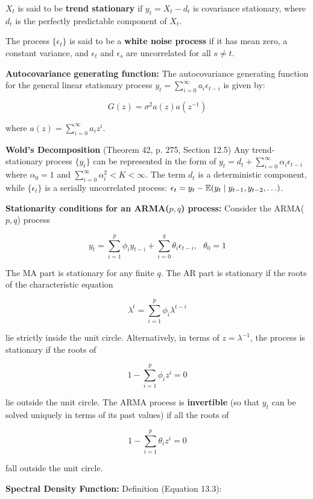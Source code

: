 \begin{definition}\label{ts.12.trendstationary}\(X_t\) is said to be \textbf{trend stationary} if \(y_t = X_t - d_t\) is covariance stationary, where \(d_t\) is the perfectly predictable component of \(X_t\).
\end{definition}

The process \(\{\epsilon_t\} \) is said to be a \textbf{white noise process} if it has mean zero, a constant variance, and \(\epsilon_t\) and \(\epsilon_s\) are uncorrelated for all \(s \neq t\).

\textbf{Autocovariance generating function:} The autocovariance generating function for the general linear stationary process \(y_t = \sum_{i=0}^\infty a_i \epsilon_{t-i}\) is given by:

\[
G(z) = \sigma^2 a(z)a(z^{-1})
\]

where \(a(z) = \sum_{i=0}^\infty a_i z^i\). 

\textbf{Wold's Decomposition} (Theorem 42, p. 275, Section 12.5) Any trend-stationary process \(\{y_t\}\) can be represented in the form of \(y_t = d_t + \sum_{i=0}^\infty \alpha_i \epsilon_{t-i}\) where \(\alpha_0 = 1\) and \(\sum_{i=0}^\infty \alpha_i^2 < K < \infty\). The term \(d_t\) is a deterministic component, while \(\{\epsilon_t\}\) is a serially uncorrelated process: \(\epsilon_t = y_t - \mathbb{E}(y_t \mid y_{t-1}, y_{t-2}, \ldots) \).

\textbf{Stationarity conditions for an ARMA(\(p,q\)) process:} Consider the ARMA(\(p, q\)) process 

\[
y_t = \sum_{i=1}^p \phi_i y_{t-i} + \sum_{i=0}^q \theta_i \epsilon_{t-i}, \ \ \ \theta_0 = 1
\]

The MA part is stationary for any finite \(q\). The AR part is stationary if the roots of the characteristic equation

\[
\lambda^t = \sum_{i=1}^p \phi_i \lambda^{t-i}
\]

lie strictly inside the unit circle. Alternatively, in terms of \(z = \lambda^{-1}\), the process is stationary if the roots of 

\[
1 - \sum_{i=1}^p \phi_i z^i = 0
\]

lie outside the unit circle. The ARMA process is \textbf{invertible} (so that \(y_t\) can be solved uniquely in terms of its past values) if all the roots of 

\[
1 - \sum_{i=1}^p \theta_i z^i = 0
\]

fall outside the unit circle.

\textbf{Spectral Density Function:} Definition (Equation 13.3):

